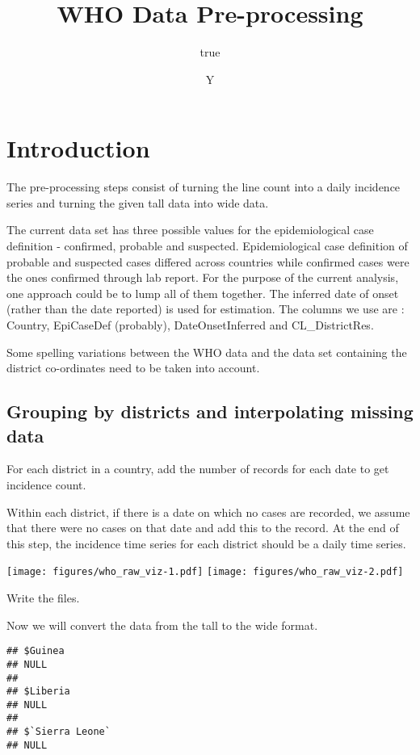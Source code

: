 \documentclass[11pt,]{article}
\title{WHO Data Pre-processing}
\author{true}
\date{Y}
\begin{document}
\maketitle

\section{Introduction}\label{introduction}

The pre-processing steps consist of turning the line count into a daily
incidence series and turning the given tall data into wide data.

The current data set has three possible values for the epidemiological
case definition - confirmed, probable and suspected. Epidemiological
case definition of probable and suspected cases differed across
countries while confirmed cases were the ones confirmed through lab
report. For the purpose of the current analysis, one approach could be
to lump all of them together. The inferred date of onset (rather than
the date reported) is used for estimation. The columns we use are :
Country, EpiCaseDef (probably), DateOnsetInferred and CL\_DistrictRes.

Some spelling variations between the WHO data and the data set
containing the district co-ordinates need to be taken into account.

\subsection{Grouping by districts and interpolating missing
data}\label{grouping-by-districts-and-interpolating-missing-data}

For each district in a country, add the number of records for each date
to get incidence count.

Within each district, if there is a date on which no cases are recorded,
we assume that there were no cases on that date and add this to the
record. At the end of this step, the incidence time series for each
district should be a daily time series.

\texttt{[image: figures/who\_raw\_viz-1.pdf]}
\texttt{[image: figures/who\_raw\_viz-2.pdf]}

Write the files.

Now we will convert the data from the tall to the wide format.

\begin{verbatim}
## $Guinea
## NULL
## 
## $Liberia
## NULL
## 
## $`Sierra Leone`
## NULL
\end{verbatim}
\end{document}
